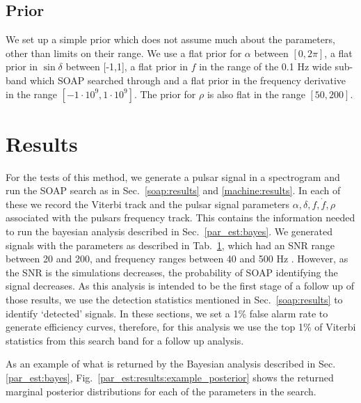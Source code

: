 %
\subsection{Prior}
%
We set up a simple prior which does not assume much about the parameters, other than limits on their range. 
We use a flat prior for $\alpha$ between $[0,2\pi]$, a flat prior in $\sin{\delta}$ between [-1,1], a flat prior in $f$ in the range of the 0.1 Hz wide sub-band which SOAP searched through and a flat prior in the frequency derivative in the range $[-1\cdot 10^{9},1\cdot 10^{9}]$.
The prior for $\rho$ is also flat in the range $[50,200]$.

\section{Results}

For the tests of this method, we generate a pulsar signal in a spectrogram and run the SOAP search as in Sec.~\ref{soap:results} and \ref{machine:results}.
In each of these we record the Viterbi track and the pulsar signal parameters $\alpha, \delta, f, \dot{f} , \rho$ associated with the pulsars frequency track.
This contains the information needed to run the bayesian analysis described in Sec.~\ref{par_est:bayes}.
We generated signals with the parameters as described in Tab.~\ref{}, which had an \gls{SNR} range between 20 and 200, and frequency ranges between 40 and 500 Hz .
However, as the \gls{SNR} is the simulations decreases, the probability of SOAP identifying the signal decreases. 
As this analysis is intended to be the first stage of a follow up of those results, we use the detection statistics mentioned in Sec.~\ref{soap:results} to identify `detected' signals.
In these sections, we set a 1\% false alarm rate to generate efficiency curves, therefore, for this analysis we use the top 1\% of Viterbi statistics from this search band for a follow up analysis.

As an example of what is returned by the Bayesian analysis described in Sec.\ref{par_est:bayes}, Fig.~\ref{par_est:results:example_posterior} shows the returned marginal posterior distributions for each of the parameters in the search.

